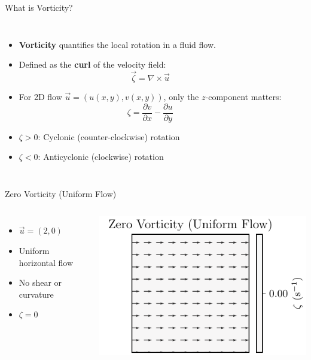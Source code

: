 
\begin{frame}{What is Vorticity?}
    \begin{columns}
      \begin{itemize}
        \item \textbf{Vorticity} quantifies the local rotation in a fluid flow.
        \item Defined as the \textbf{curl} of the velocity field:
        \[
          \vec{\zeta} = \nabla \times \vec{u}
        \]
        \item For 2D flow \( \vec{u} = (u(x,y), v(x,y)) \), only the \(z\)-component matters:
        \[
          \zeta = \frac{\partial v}{\partial x} - \frac{\partial u}{\partial y}
        \]
        \item \(\zeta > 0\): Cyclonic (counter-clockwise) rotation
        \item \(\zeta < 0\): Anticyclonic (clockwise) rotation
      \end{itemize}
    
      \vspace{2cm}  %
    \end{columns}
    \end{frame}
    

\begin{frame}{Zero Vorticity (Uniform Flow)}
    \begin{columns}
      \begin{itemize}
        \item \( \vec{u} = (2, 0) \)
        \item Uniform horizontal flow
        \item No shear or curvature
        \item \( \zeta = 0 \)
      \end{itemize}
    
      \includegraphics[width=\linewidth]{../images/vorticity_plot0.pdf}
    \end{columns}
    \end{frame}
    
